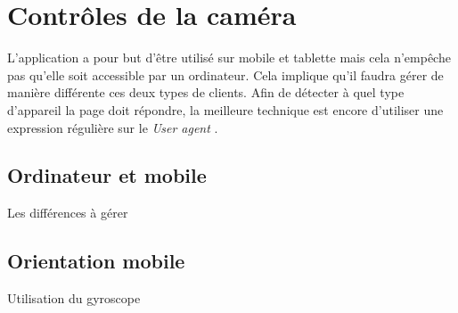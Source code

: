 \section{Contrôles de la caméra}
L'application a pour but d'être utilisé sur mobile et tablette mais cela n'empêche pas qu'elle soit accessible par un ordinateur. Cela implique qu'il faudra gérer de manière différente ces deux types de clients. Afin de détecter à quel type d'appareil la page doit répondre, la meilleure technique est encore d'utiliser une expression régulière sur le \emph{User agent} \cite{wiki-useragent}.

\subsection{Ordinateur et mobile}
Les différences à gérer
\subsection{Orientation mobile}
Utilisation du gyroscope
